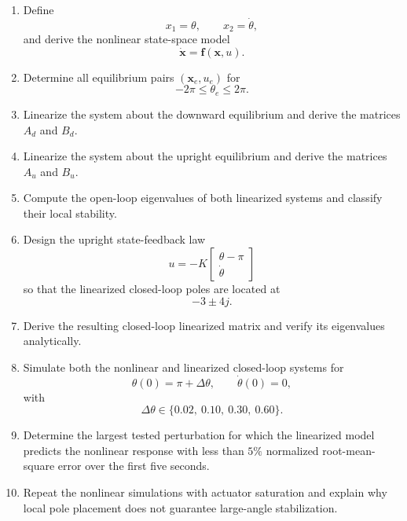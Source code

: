 \begin{enumerate}
    \item Define
    \begin{equation}
    x_1=\theta,
    \qquad
    x_2=\dot{\theta},
    \end{equation}
    and derive the nonlinear state-space model
    \begin{equation}
    \dot{\mathbf{x}}
    =
    \mathbf{f}(\mathbf{x},u).
    \end{equation}

    \item Determine all equilibrium pairs $(\mathbf{x}_e,u_e)$ for
    \begin{equation}
    -2\pi\leq\theta_e\leq2\pi.
    \end{equation}

    \item Linearize the system about the downward equilibrium and derive
    the matrices $A_d$ and $B_d$.

    \item Linearize the system about the upright equilibrium and derive
    the matrices $A_u$ and $B_u$.

    \item Compute the open-loop eigenvalues of both linearized systems and
    classify their local stability.

    \item Design the upright state-feedback law
    \begin{equation}
    u
    =
    -K
    \begin{bmatrix}
    \theta-\pi\\
    \dot{\theta}
    \end{bmatrix}
    \end{equation}
    so that the linearized closed-loop poles are located at
    \begin{equation}
    -3\pm4j.
    \end{equation}

    \item Derive the resulting closed-loop linearized matrix and verify its
    eigenvalues analytically.

    \item Simulate both the nonlinear and linearized closed-loop systems for
    \begin{equation}
    \theta(0)=\pi+\Delta\theta,
    \qquad
    \dot{\theta}(0)=0,
    \end{equation}
    with
    \begin{equation}
    \Delta\theta
    \in
    \{0.02,\ 0.10,\ 0.30,\ 0.60\}.
    \end{equation}

    \item Determine the largest tested perturbation for which the linearized
    model predicts the nonlinear response with less than $5\%$ normalized
    root-mean-square error over the first five seconds.

    \item Repeat the nonlinear simulations with actuator saturation and
    explain why local pole placement does not guarantee large-angle
    stabilization.
\end{enumerate}


